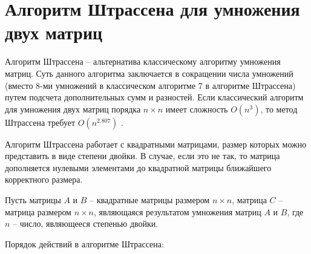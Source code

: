 \section{Алгоритм Штрассена для умножения двух матриц}

Алгоритм Штрассена -- альтернатива классическому алгоритму умножения матриц. Суть данного алгоритма заключается в сокращении числа умножений (вместо 8-ми умножений в классическом алгоритме 7 в алгоритме Штрассена) путем подсчета дополнительных сумм и разностей. Если классический алгоритм для умножения двух матриц порядка $n \times n$ имеет сложность $O(n^3)$, то метод Штрассена требует $O(n^{2.807})$ \cite{stras2}.

Алгоритм Штрассена работает с квадратными матрицами, размер которых можно представить в виде степени двойки. В случае, если это не так, то матрица дополняется нулевыми элементами до квадратной матрицы ближайшего корректного размера.

Пусть матрицы $A$ и $B$ -- квадратные матрицы размером $n \times n$, матрица $C$ -- матрица размером $n \times n$, являющаяся результатом умножения матриц $A$ и $B$, где $n$ -- число, являющееся степенью двойки.

Порядок действий в алгоритме Штрассена:

